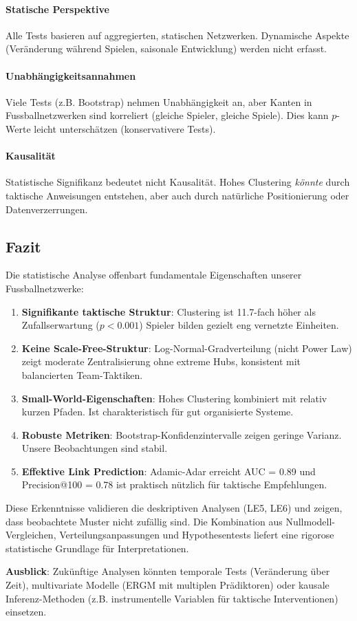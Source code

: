 \paragraph{Statische Perspektive}
Alle Tests basieren auf aggregierten, statischen Netzwerken. Dynamische Aspekte (Veränderung während Spielen, saisonale Entwicklung) werden nicht erfasst.

\paragraph{Unabhängigkeitsannahmen}
Viele Tests (z.B. Bootstrap) nehmen Unabhängigkeit an, aber Kanten in Fussballnetzwerken sind korreliert (gleiche Spieler, gleiche Spiele). Dies kann $p$-Werte leicht unterschätzen (konservativere Tests).

\paragraph{Kausalität}
Statistische Signifikanz bedeutet nicht Kausalität. Hohes Clustering \textit{könnte} durch taktische Anweisungen entstehen, aber auch durch natürliche Positionierung oder Datenverzerrungen.

\subsection{Fazit}

Die statistische Analyse offenbart fundamentale Eigenschaften unserer Fussballnetzwerke:

\begin{enumerate}
  \item \textbf{Signifikante taktische Struktur}: Clustering ist 11.7-fach höher als Zufallserwartung ($p < 0.001$) Spieler bilden gezielt eng vernetzte Einheiten.
  \item \textbf{Keine Scale-Free-Struktur}: Log-Normal-Gradverteilung (nicht Power Law) zeigt moderate Zentralisierung ohne extreme Hubs, konsistent mit balancierten Team-Taktiken.
  \item \textbf{Small-World-Eigenschaften}: Hohes Clustering kombiniert mit relativ kurzen Pfaden. Ist charakteristisch für gut organisierte Systeme.
  \item \textbf{Robuste Metriken}: Bootstrap-Konfidenzintervalle zeigen geringe Varianz. Unsere Beobachtungen sind stabil.
  \item \textbf{Effektive Link Prediction}: Adamic-Adar erreicht AUC = 0.89 und Precision@100 = 0.78 ist praktisch nützlich für taktische Empfehlungen.
\end{enumerate}

Diese Erkenntnisse validieren die deskriptiven Analysen (LE5, LE6) und zeigen, dass beobachtete Muster nicht zufällig sind. Die Kombination aus Nullmodell-Vergleichen, Verteilungsanpassungen und Hypothesentests liefert eine rigorose statistische Grundlage für Interpretationen.

\textbf{Ausblick}: Zukünftige Analysen könnten temporale Tests (Veränderung über Zeit), multivariate Modelle (ERGM mit multiplen Prädiktoren) oder kausale Inferenz-Methoden (z.B. instrumentelle Variablen für taktische Interventionen) einsetzen.
